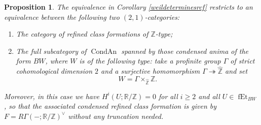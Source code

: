 \documentclass[12pt]{article}
\newtheorem{proposition}[theorem]{Proposition}
\theoremstyle{definition}
\newcommand{\on}{\operatorname}
\newcommand{\mbb}{\mathbb}
\newcommand{\wh}{\widehat}
\begin{document}
\begin{proposition}\label{ztype}
The equivalence in Corollary \ref{weildeterminesrcf} restricts to an equivalence between the following two $(2,1)$-categories:

\begin{enumerate}
\item The category of refined class formations of $\mbb{Z}$-type;
\item The full subcategory of $\on{CondAn}$ spanned by those condensed anima of the form $BW$, where $W$ is of the following type: take a profinite group $\Gamma$ of \emph{strict cohomological dimension $2$} and a surjective homomorphism $\Gamma\twoheadrightarrow \wh{\mbb{Z}}$ and set
$$W= \Gamma\times_{\wh{\mbb{Z}}}\mbb{Z}.$$
\end{enumerate}
Moreover, in this case we have $H^i(U;\mbb{R}/\mbb{Z})=0$ for all $i\geq 2$ and all $U\in\on{fEt}_{BW}$, so that the associated condensed refined class formation is given by $F=R\Gamma(-;\mbb{R}/\mbb{Z})^\vee$ without any truncation needed.
\end{proposition}
\end{document}
